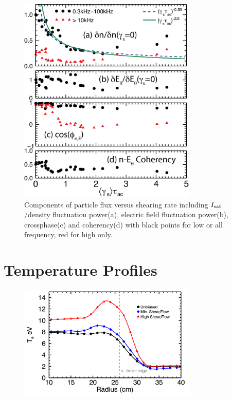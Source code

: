 \documentclass[aip,pop,amsmath,amssymb,preprint,superscriptaddress]{revtex4-1} %
\begin{document}
\begin{figure}[!htbp]
\centerline{
\includegraphics[width=8.5cm]{figure5.eps}}
\caption{\label{fig:fluxcomps} Components of particle flux versus shearing rate including $I_{\rm sat}$/density fluctuation power(a), electric field fluctuation power(b), crossphase(c) and coherency(d) with black points for low or all frequency, red for high only.}
\end{figure}

\section{Temperature Profiles}
\begin{figure}[!htbp]
\centerline{
\includegraphics[width=8.5cm]{tempprofs.png}}
\caption{\label{fig:tempprofs}}
\end{figure}
\end{document}
